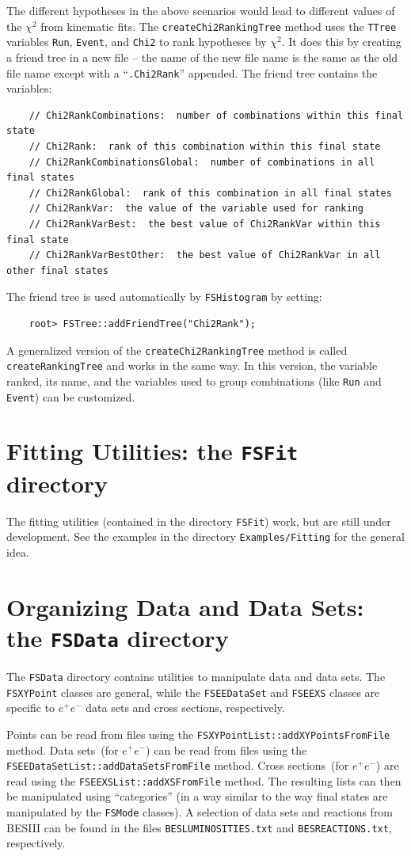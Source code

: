 \documentclass[11pt]{article}
\begin{document}
The different hypotheses in the above scenarios would lead to different values of the $\chi^2$ from kinematic fits.  The {\tt createChi2RankingTree} method uses the {\tt TTree} variables {\tt Run}, {\tt Event}, and {\tt Chi2} to rank hypotheses by $\chi^2$.  It does this by creating a friend tree in a new file -- the name of the new file name is the same as the old file name except with a ``{\tt .Chi2Rank}'' appended.  The friend tree contains the variables:
\begin{verbatim}
    // Chi2RankCombinations:  number of combinations within this final state
    // Chi2Rank:  rank of this combination within this final state
    // Chi2RankCombinationsGlobal:  number of combinations in all final states
    // Chi2RankGlobal:  rank of this combination in all final states
    // Chi2RankVar:  the value of the variable used for ranking
    // Chi2RankVarBest:  the best value of Chi2RankVar within this final state
    // Chi2RankVarBestOther:  the best value of Chi2RankVar in all other final states
\end{verbatim}
The friend tree is used automatically by {\tt FSHistogram} by setting:
\begin{verbatim}
    root> FSTree::addFriendTree("Chi2Rank");
\end{verbatim}
A generalized version of the {\tt createChi2RankingTree} method is called {\tt createRankingTree} and works in the same way.  In this version, the variable ranked, its name, and the variables used to group combinations (like {\tt Run} and {\tt Event}) can be customized.


\section{Fitting Utilities:  the {\tt FSFit} directory}

The fitting utilities (contained in the directory {\tt FSFit}) work, but are still under development.  See the examples in the directory {\tt Examples/Fitting} for the general idea.

\section{Organizing Data and Data Sets: the {\tt FSData} directory}

The {\tt FSData} directory contains utilities to manipulate data and data sets.  The {\tt FSXYPoint} classes are general, while the {\tt FSEEDataSet} and {\tt FSEEXS} classes are specific to $e^+e^-$ data sets and cross sections, respectively.

Points can be read from files using the {\tt FSXYPointList::addXYPointsFromFile} method.
Data sets~(for $e^+e^-$) can be read from files using the {\tt FSEEDataSetList::addDataSetsFromFile} method.  Cross sections~(for $e^+e^-$) are read using the {\tt FSEEXSList::addXSFromFile} method.  The resulting lists can then be manipulated using ``categories'' (in a way similar to the way final states are manipulated by the {\tt FSMode} classes).  A selection of data sets and reactions from BESIII can be found in the files {\tt BESLUMINOSITIES.txt} and {\tt BESREACTIONS.txt}, respectively.
\end{document}
